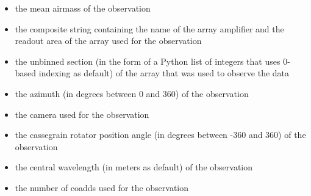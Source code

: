 \documentclass[letterpaper,10pt,english]{sphinxmanual}
\begin{document}
\begin{itemize}
\item {} 
the mean airmass of the observation

\end{itemize}

\begin{itemize}
\item {} 
the composite string containing the name of the array amplifier and the
readout area of the array used for the observation

\end{itemize}

\begin{itemize}
\item {} 
the unbinned section (in the form of a Python list of integers that uses
0-based indexing as default) of the array that was used to observe the data

\end{itemize}

\begin{itemize}
\item {} 
the azimuth (in degrees between 0 and 360) of the observation

\end{itemize}

\begin{itemize}
\item {} 
the camera used for the observation

\end{itemize}

\begin{itemize}
\item {} 
the cassegrain rotator position angle (in degrees between -360 and 360) of
the observation

\end{itemize}

\begin{itemize}
\item {} 
the central wavelength (in meters as default) of the observation

\end{itemize}

\begin{itemize}
\item {} 
the number of coadds used for the observation

\end{itemize}
\end{document}
